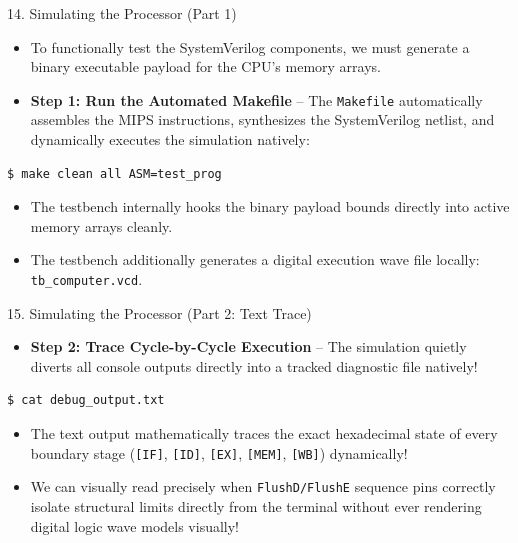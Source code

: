 \documentclass[aspectratio=169]{beamer}
\begin{document}
\begin{frame}[fragile]{14. Simulating the Processor (Part 1)}
\begin{itemize}
    \item To functionally test the SystemVerilog components, we must generate a binary executable payload for the CPU's memory arrays.
    \item \textbf{Step 1: Run the Automated Makefile} – The \texttt{Makefile} automatically assembles the MIPS instructions, synthesizes the SystemVerilog netlist, and dynamically executes the simulation natively:
\end{itemize}
\begin{verbatim}
$ make clean all ASM=test_prog
\end{verbatim}
\begin{itemize}
    \item The testbench internally hooks the binary payload bounds directly into active memory arrays cleanly.
    \item The testbench additionally generates a digital execution wave file locally: \texttt{tb\_computer.vcd}.
\end{itemize}
\end{frame}

\begin{frame}[fragile]{15. Simulating the Processor (Part 2: Text Trace)}
\begin{itemize}
    \item \textbf{Step 2: Trace Cycle-by-Cycle Execution} – The simulation quietly diverts all console outputs directly into a tracked diagnostic file natively!
\end{itemize}
\begin{verbatim}
$ cat debug_output.txt
\end{verbatim}
\begin{itemize}
    \item The text output mathematically traces the exact hexadecimal state of every boundary stage (\texttt{[IF]}, \texttt{[ID]}, \texttt{[EX]}, \texttt{[MEM]}, \texttt{[WB]}) dynamically!
    \item We can visually read precisely when \texttt{FlushD/FlushE} sequence pins correctly isolate structural limits directly from the terminal without ever rendering digital logic wave models visually!
\end{itemize}
\end{frame}
\end{document}
